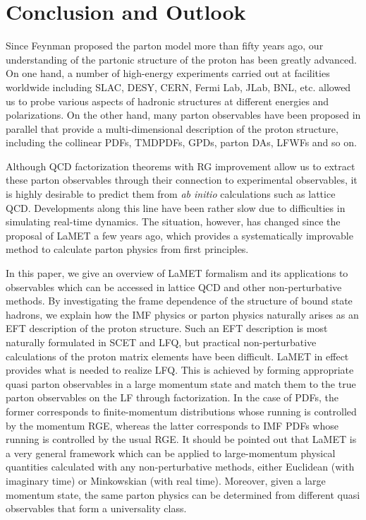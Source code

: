 \section{Conclusion and Outlook}
\label{sec:conclusion}

Since Feynman proposed the parton model more than fifty years ago, our understanding of the partonic structure of the proton has been greatly advanced. On one hand, a number of high-energy experiments carried out at facilities worldwide including SLAC, DESY, CERN, Fermi Lab, JLab, BNL, etc. allowed us to probe various aspects of hadronic structures at different energies and polarizations. On the other hand, many parton observables have been proposed in parallel
that provide a multi-dimensional description of the proton structure, including the collinear
PDFs, TMDPDFs, GPDs, parton DAs, LFWFs and so on.

Although QCD factorization theorems with RG improvement allow us to extract these parton observables through their connection to experimental observables, it is highly desirable to predict them from {\it ab initio}
calculations such as lattice QCD. Developments along this line have been rather slow due to
difficulties in simulating real-time dynamics. The situation, however, has changed since the proposal of LaMET a few years ago, which provides a systematically improvable method to calculate parton physics from first principles.

In this paper, we give an overview of LaMET formalism and its applications to observables which
can be accessed in lattice QCD and other non-perturbative methods.  By investigating the frame dependence of the structure of bound state hadrons, we explain how the IMF physics or parton physics naturally arises as an EFT description of the proton structure. Such an EFT description is most naturally formulated in SCET and LFQ,
but practical non-perturbative calculations of the proton matrix elements
have been difficult. LaMET in effect provides what is needed to realize LFQ. This is achieved by forming appropriate quasi parton observables in a large momentum state and match them to the true parton observables on the LF through factorization. In the case of PDFs, the former corresponds to finite-momentum distributions whose running is controlled by the momentum RGE, whereas the latter corresponds to IMF PDFs whose running is controlled by the usual RGE. It should be pointed out that
LaMET is a very general framework which can be applied to
large-momentum physical quantities calculated with any non-perturbative methods,
either Euclidean (with imaginary time) or Minkowskian (with real time).
Moreover, given a large momentum state, the same parton physics can be determined
from different quasi observables that form a universality class.

